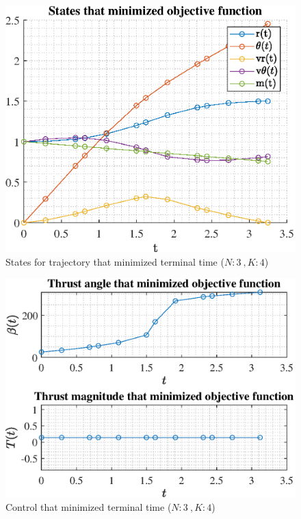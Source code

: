 \documentclass[]{article}
\begin{document}
\begin{figure}
	\centering
	\includegraphics[scale=0.75]{states_N3_K4_C3_tf.eps}
	\caption{States for trajectory that minimized terminal time (\(N:3\ , K:4\))}
	\label{fig:states_N3_K4_C3_tf}
\end{figure}
\begin{figure}
	\centering
	\includegraphics[scale=0.75]{control_N3_K4_C3_tf.eps}
	\caption{Control that minimized terminal time (\(N:3\ , K:4\))}
	\label{fig:control_N3_K4_C3_tf}
\end{figure}
\end{document}
